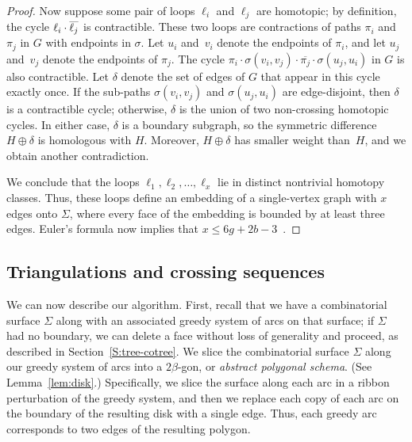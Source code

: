 \documentclass[letterpaper,review]{siamart190516}
\def\reverse#1{\smash{\overline{#1}}}
\begin{document}
\begin{proof}
Now suppose some pair of loops $\ell_i$ and $\ell_j$ are homotopic; by definition, the cycle $\ell_i\cdot\reverse{\ell_j}$ is contractible.  These two loops are contractions of paths $\pi_i$ and $\pi_j$ in $G$ with endpoints in $\sigma$.  Let $u_i$ and~$v_i$ denote the endpoints of $\pi_i$, and let $u_j$ and~$v_j$ denote the endpoints of $\pi_j$.  The cycle $\pi_i \cdot \sigma(v_i,v_j) \cdot \overline{\pi_j} \cdot \sigma(u_j, u_i)$ in $G$ is also contractible.  Let $\delta$ denote the set of edges of $G$ that appear in this cycle exactly once.  If the sub-paths $\sigma(v_i,v_j)$ and $\sigma(u_j, u_i)$ are edge-disjoint, then $\delta$ is a contractible cycle; otherwise, $\delta$ is the union of two non-crossing homotopic cycles.  In either case, $\delta$ is a boundary subgraph, so the symmetric difference $H\oplus\delta$ is homologous with $H$.  Moreover, $H\oplus\delta$ has smaller weight than~$H$, and we obtain another contradiction.

We conclude that the loops $\ell_1, \ell_2, \dots, \ell_x$ lie in distinct nontrivial homotopy classes.  Thus, these loops define an embedding of a single-vertex graph with $x$ edges onto $\Sigma$, where every face of the embedding is bounded by at least three edges.  Euler's formula now implies that $x\le 6g+2b-3$~\cite[Lemma~2.1]{ccelw-scsih-08}.
\end{proof}


\subsection{Triangulations and crossing sequences}
\label{SS:homotopy-triangulation}

We can now describe our algorithm.  First, recall that we have a combinatorial surface $\Sigma$ along with an associated greedy system of arcs on that surface; if $\Sigma$ had no boundary, we can delete a face without loss of generality and proceed, as described in Section~\ref{S:tree-cotree}.
We slice the combinatorial surface $\Sigma$ along our greedy system of arcs into a $2\beta$-gon, or \emph{abstract polygonal schema}.  (See Lemma~\ref{lem:disk}.)
Specifically, we slice the surface along each arc in a ribbon perturbation of the greedy system, and then we replace each copy of each arc on the boundary of the resulting disk with a single edge.  Thus, each greedy arc corresponds to two edges of the resulting polygon.
\end{document}
